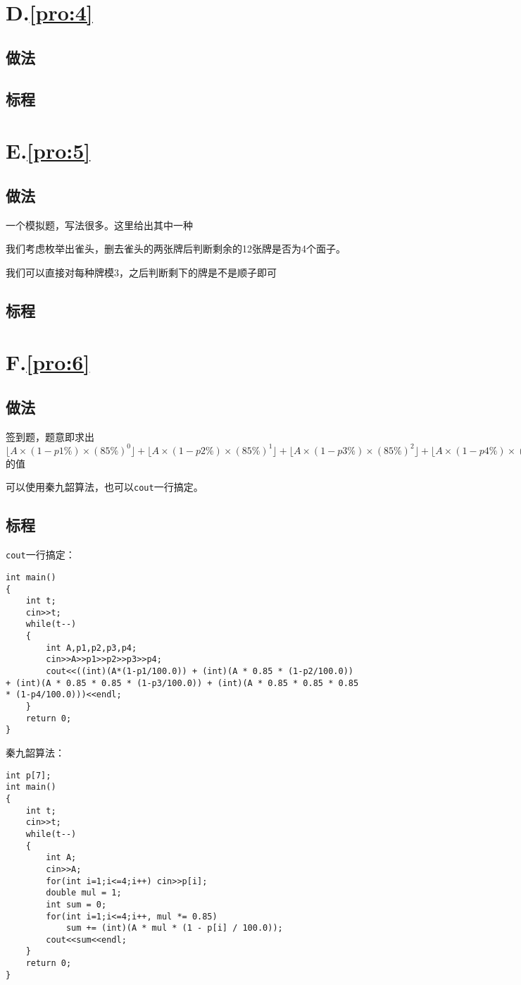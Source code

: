 \documentclass[
	lang=cn,
	color=blue
]{elegantbook}
\begin{document}
\chapter*{D.\quad \ref*{pro:4}}
\section*{做法}

\section*{标程}

\chapter*{E.\quad \ref*{pro:5}}
\section*{做法}

一个模拟题，写法很多。这里给出其中一种

我们考虑枚举出雀头，删去雀头的两张牌后判断剩余的12张牌是否为4个面子。

我们可以直接对每种牌模3，之后判断剩下的牌是不是顺子即可

\section*{标程}

\chapter*{F.\quad \ref*{pro:6}}
\section*{做法}
签到题，题意即求出$\lfloor A \times (1-p1\%) \times (85\%)^0 \rfloor + \lfloor A \times (1-p2\%) \times (85\%)^1 \rfloor + \lfloor A \times (1-p3\%) \times (85\%)^2 \rfloor + \lfloor A \times (1-p4\%) \times (85\%)^3 \rfloor$的值

可以使用秦九韶算法，也可以\lstinline{cout}一行搞定。

\section*{标程}
\lstinline{cout}一行搞定：
\begin{lstlisting}
int main()
{
    int t;
    cin>>t;
    while(t--)
    {
        int A,p1,p2,p3,p4;
        cin>>A>>p1>>p2>>p3>>p4;
        cout<<((int)(A*(1-p1/100.0)) + (int)(A * 0.85 * (1-p2/100.0)) + (int)(A * 0.85 * 0.85 * (1-p3/100.0)) + (int)(A * 0.85 * 0.85 * 0.85 * (1-p4/100.0)))<<endl;
    }
    return 0;
}
\end{lstlisting}

秦九韶算法：
\begin{lstlisting}
int p[7];
int main()
{
    int t;
    cin>>t;
    while(t--)
    {
        int A;
        cin>>A;
        for(int i=1;i<=4;i++) cin>>p[i];
        double mul = 1;
        int sum = 0;
        for(int i=1;i<=4;i++, mul *= 0.85)
            sum += (int)(A * mul * (1 - p[i] / 100.0));
        cout<<sum<<endl;
    }
    return 0;
}
\end{lstlisting}
\end{document}
